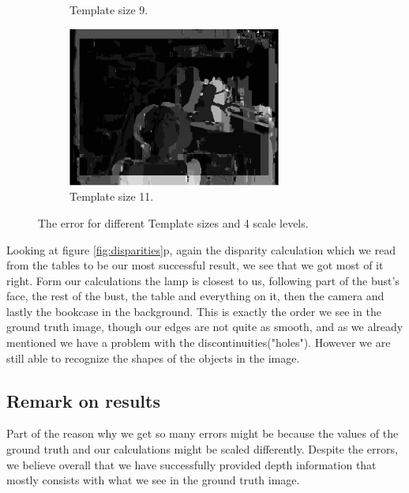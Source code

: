 \documentclass[12pt,a4paper,oneside,final]{article}
\begin{document}
\begin{figure}[H]
\begin{subfigure}[b]{0.5\textwidth}
		\caption{Template size 9.}
	\end{subfigure}%
	\begin{subfigure}[b]{0.5\textwidth}
		\centering
		\includegraphics[width=7cm]{errk11.png}
		\caption{Template size 11.}
	\end{subfigure}
	\caption{The error for different Template sizes and 4 scale levels.}
	\label{fig:error}
\end{figure}

Looking at figure \ref{fig:disparities}p, again the disparity calculation which we read from the tables to be our most successful result, we see that we got most of it right. Form our calculations the lamp is closest to us, following part of the bust's face, the rest of the bust, the table and everything on it, then the camera and lastly the bookcase in the background. This is exactly the order we see in the ground truth image, though our edges are not quite as smooth, and as we already mentioned we have a problem with the discontinuities("holes"). However we are still able to recognize the shapes of the objects in the image. 

\subsection{Remark on results}
Part of the reason why we get so many errors might be because the values of the ground truth and our calculations might be scaled differently. Despite the errors, we believe overall that we have successfully provided depth information that mostly consists with what we see in the ground truth image.
\end{document}
